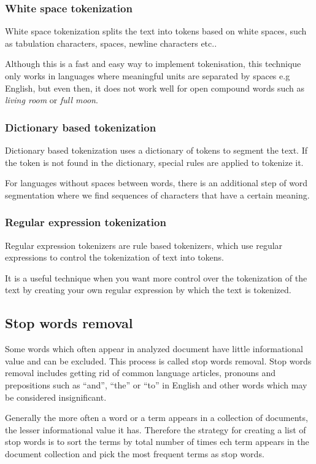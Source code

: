 \subsubsection{White space tokenization}
White space tokenization splits the text into tokens based on white spaces, such as tabulation characters, spaces, newline characters etc.. 

Although this is a fast and easy way to implement tokenisation, this technique only works in languages where meaningful units are separated by spaces e.g  English, but even then, it does not work well for open compound words such as \textit{living room} or \textit{full moon}.\cite{tokenization_mgl}
\subsubsection{Dictionary based tokenization}
Dictionary based tokenization uses a dictionary of tokens to segment the text. If the token is not found in the dictionary, special rules are applied to tokenize it.\cite{tokenization_twd}

For languages without spaces between words, there is an additional step of word segmentation where we find sequences of characters that have a certain meaning.\cite{tokenization_mgl}
\subsubsection{Regular expression tokenization}
Regular expression tokenizers are rule based tokenizers, which use regular expressions to control the tokenization of text into tokens.\cite{tokenization_twd}

It is a useful technique when you want more control over the tokenization of the text by creating your own regular expression by which the text is tokenized.
\subsection{Stop words removal}
Some words which often appear in analyzed document have little informational value and can be excluded. This process is called stop words removal. Stop words removal includes getting rid of common language articles, pronouns and prepositions such as “and”, “the” or “to” in English and other words which may be considered insignificant.\cite{nlp_tasks}

Generally the more often a word or a term appears in a collection of documents, the lesser informational value it has. Therefore the strategy for creating a list of stop words is to sort the terms by total number of times ech term appears in the document collection and pick the most frequent terms as stop words.\cite{stopwords}


